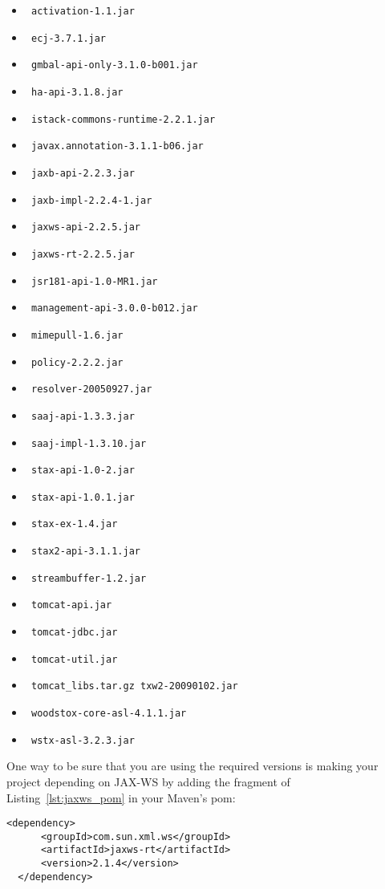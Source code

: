 \begin{itemize}
\item \verb! activation-1.1.jar!
\item \verb! ecj-3.7.1.jar!
\item \verb! gmbal-api-only-3.1.0-b001.jar!
\item \verb! ha-api-3.1.8.jar!
\item \verb! istack-commons-runtime-2.2.1.jar!
\item \verb! javax.annotation-3.1.1-b06.jar!
\item \verb! jaxb-api-2.2.3.jar!
\item \verb! jaxb-impl-2.2.4-1.jar!
\item \verb! jaxws-api-2.2.5.jar!
\item \verb! jaxws-rt-2.2.5.jar!
\item \verb! jsr181-api-1.0-MR1.jar!
\item \verb! management-api-3.0.0-b012.jar!
\item \verb! mimepull-1.6.jar!
\item \verb! policy-2.2.2.jar!
\item \verb! resolver-20050927.jar!
\item \verb! saaj-api-1.3.3.jar!
\item \verb! saaj-impl-1.3.10.jar!
\item \verb! stax-api-1.0-2.jar!
\item \verb! stax-api-1.0.1.jar!
\item \verb! stax-ex-1.4.jar!
\item \verb! stax2-api-3.1.1.jar!
\item \verb! streambuffer-1.2.jar!
\item \verb! tomcat-api.jar!
\item \verb! tomcat-jdbc.jar!
\item \verb! tomcat-util.jar!
\item \verb! tomcat_libs.tar.gz txw2-20090102.jar!
\item \verb! woodstox-core-asl-4.1.1.jar!
\item \verb! wstx-asl-3.2.3.jar!
\end{itemize}

One way to be sure that you are using the required versions is making your project depending on JAX-WS by adding the fragment of Listing~\ref{lst:jaxws_pom} in your Maven's pom:

{\footnotesize
\begin{lstlisting}[caption=Making your project depending on JAX-WS using Maven, label=lst:jaxws_pom]
  <dependency>
      <groupId>com.sun.xml.ws</groupId>
      <artifactId>jaxws-rt</artifactId>
      <version>2.1.4</version>
  </dependency>
\end{lstlisting}
}

